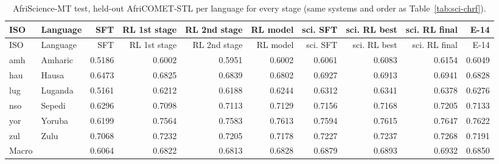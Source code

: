 {\scriptsize\setlength{\tabcolsep}{1.5pt}
\begin{longtable}{@{}llrrrrrrrr@{}}
\caption{AfriScience-MT test, held-out AfriCOMET-STL per language for every stage (same systems and order as Table~\ref{tab:sci-chrf}).}\label{tab:sci-comet}\\
\toprule
ISO & Language & SFT & RL 1st stage & RL 2nd stage & RL model & sci. SFT & sci. RL best & sci. RL final & E-14 \\
\midrule\endfirsthead
\toprule
ISO & Language & SFT & RL 1st stage & RL 2nd stage & RL model & sci. SFT & sci. RL best & sci. RL final & E-14 \\
\midrule\endhead
\midrule\endfoot
\bottomrule\endlastfoot
amh & Amharic & 0.5186 & 0.6002 & 0.5951 & 0.6002 & 0.6061 & 0.6083 & 0.6154 & 0.6049 \\
hau & Hausa & 0.6473 & 0.6825 & 0.6839 & 0.6802 & 0.6927 & 0.6913 & 0.6941 & 0.6828 \\
lug & Luganda & 0.5161 & 0.6212 & 0.6188 & 0.6244 & 0.6312 & 0.6341 & 0.6378 & 0.6276 \\
nso & Sepedi & 0.6296 & 0.7098 & 0.7113 & 0.7129 & 0.7156 & 0.7168 & 0.7205 & 0.7133 \\
yor & Yoruba & 0.6199 & 0.7564 & 0.7583 & 0.7613 & 0.7594 & 0.7615 & 0.7647 & 0.7622 \\
zul & Zulu & 0.7068 & 0.7232 & 0.7205 & 0.7178 & 0.7227 & 0.7237 & 0.7268 & 0.7191 \\
\midrule Macro &  & 0.6064 & 0.6822 & 0.6813 & 0.6828 & 0.6879 & 0.6893 & 0.6932 & 0.6850 \\
\end{longtable}}
